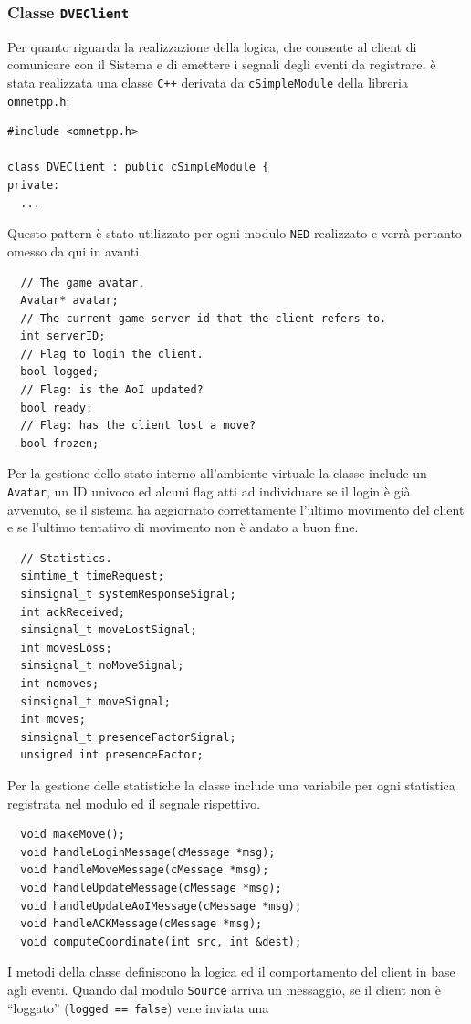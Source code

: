 \documentclass[a4paper, 11pt, oneside]{book}
\newcommand{\files}[1]{\texttt{#1}}
\theoremstyle{definition}
\theoremstyle{remark}
\begin{document}
\subsubsection{Classe \files{DVEClient}}
Per quanto riguarda la realizzazione della logica, che consente al client di
comunicare con il Sistema e di emettere i segnali degli eventi da registrare,
è stata realizzata una classe \texttt{C++} derivata da \texttt{cSimpleModule}
della libreria \texttt{omnetpp.h}:
\begin{lstlisting}
#include <omnetpp.h>

class DVEClient : public cSimpleModule {
private:
  ...
\end{lstlisting}
Questo pattern è stato utilizzato per ogni modulo \texttt{NED} realizzato e
verrà pertanto omesso da qui in avanti.
\begin{lstlisting}
  // The game avatar.
  Avatar* avatar;
  // The current game server id that the client refers to.
  int serverID;
  // Flag to login the client.
  bool logged;
  // Flag: is the AoI updated?
  bool ready;
  // Flag: has the client lost a move?
  bool frozen;
\end{lstlisting}
Per la gestione dello stato interno all'ambiente virtuale la classe include un
\files{Avatar}, un ID univoco ed alcuni flag atti ad individuare se il login
è già avvenuto, se il sistema ha aggiornato correttamente l'ultimo movimento
del client e se l'ultimo tentativo di movimento non è andato a buon fine.
\begin{lstlisting}
  // Statistics.
  simtime_t timeRequest;
  simsignal_t systemResponseSignal;
  int ackReceived;
  simsignal_t moveLostSignal;
  int movesLoss;
  simsignal_t noMoveSignal;
  int nomoves;
  simsignal_t moveSignal;
  int moves;
  simsignal_t presenceFactorSignal;
  unsigned int presenceFactor;
\end{lstlisting}
Per la gestione delle statistiche la classe include una variabile per ogni
statistica registrata nel modulo ed il segnale rispettivo.
\begin{lstlisting}
  void makeMove();
  void handleLoginMessage(cMessage *msg);
  void handleMoveMessage(cMessage *msg);
  void handleUpdateMessage(cMessage *msg);
  void handleUpdateAoIMessage(cMessage *msg);
  void handleACKMessage(cMessage *msg);
  void computeCoordinate(int src, int &dest);
\end{lstlisting}
I metodi della classe definiscono la logica ed il comportamento del client
in base agli eventi. Quando dal modulo \files{Source} arriva un messaggio,
se il client non è ``loggato'' (\files{logged == false}) vene inviata una
\end{document}
